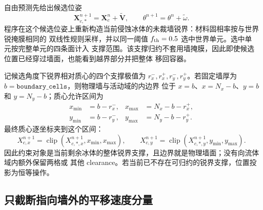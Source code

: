 \documentclass[UTF8,zihao=-4]{ctexart}
\newcommand{\vect}[1]{\boldsymbol{#1}}
\newcommand{\clip}{\operatorname{clip}}
\newcommand{\code}[1]{\texttt{#1}}
\numberwithin{equation}{section}
\begin{document}
自由预测先给出候选位姿
\begin{equation}
  \vect X_{c,*}^{n+1}=\vect X_c^n+\widetilde{\vect V},
  \qquad
  \theta^{n+1}=\theta^n+\widetilde\omega.
  \label{eq:free-pose-update}
\end{equation}
程序在这个候选位姿上重新构造当前侵蚀冰体的未裁墙锐界：材料固相率按与世界锐掩膜相同的
双线性规则采样，并以同一阈值 $f_{\rm th}=0.5$ 选中世界单元。选中单元按完整单元的四条面计入
支撑范围。该支撑归约不套用墙掩膜，因此即使候选位置已经穿过墙面，也能看到越界部分并把整体
移回容器。

记候选角度下锐界相对质心的四个支撑极值为
$r_x^-,r_x^+,r_y^-,r_y^+$。若固定墙厚为 $b=\code{boundary\_cells}$，则物理墙与活动域的内边界
位于 $x=b$、$x=N_x-b$、$y=b$ 和 $y=N_y-b$；质心允许区间为
\begin{align}
  x_{\min}&=b-r_x^-,
  &x_{\max}&=N_x-b-r_x^+,\\
  y_{\min}&=b-r_y^-,
  &y_{\max}&=N_y-b-r_y^+.
  \label{eq:body-center-wall-bounds}
\end{align}
最终质心逐坐标夹到这个区间：
\begin{equation}
  X_{c,x}^{n+1}=\clip(X_{c,*,x}^{n+1},x_{\min},x_{\max}),
  \qquad
  X_{c,y}^{n+1}=\clip(X_{c,*,y}^{n+1},y_{\min},y_{\max}).
  \label{eq:body-position-clamp}
\end{equation}
因此约束对象是当前剩余冰体的整体锐界支撑，且边界就是物理墙面；没有向流体域内额外保留两格或
其他 clearance。若当前已不存在可归约的锐界支撑，位置投影为恒等操作。

\subsection{只截断指向墙外的平移速度分量}
\end{document}
